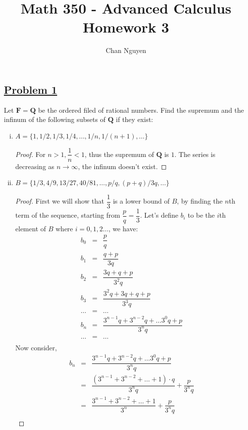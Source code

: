 \documentclass[10pt,letterpaper]{article}
\title{\textbf{Math 350 - Advanced Calculus \\ Homework 3}}
\author{Chan Nguyen}
\begin{document}
\tableofcontents 
\maketitle

\setlength{\parindent}{0pt}
\setlength{\parskip}{1ex}
	\subsection*{{\color{purple}\underline{Problem 1}}}
	Let $\mathbf{F} = \mathbf{Q}$ be the ordered filed of rational numbers. Find the supremum and the infinum of the 
	following subsets of $\mathbf{Q}$ if they exist:
	\begin{enumerate}[(i)]
		\item $A = \{1, 1/2, 1/3, 1/4, \ldots , 1/n, 1/(n + 1), \ldots\}$
		\begin{proof}
		For $n > 1, \dfrac{1}{n} < 1$, thus the supremum of $\mathbf{Q}$ is $1$. The series is decreasing
		as $n \rightarrow \infty$, the infinum doesn't exist.
		\end{proof}
		\item $B = \{1/3, 4/9, 13/27, 40/81, \ldots , p/q, (p + q)/3q, \ldots\}$
		\begin{proof}
		First we will show that $\dfrac{1}{3}$ is a lower bound of $B$, by finding the $n$th term of the sequence, starting 
		from $\dfrac{p}{q} = \dfrac{1}{3}$. Let's define $b_i$ to be the $i$th element of $B$ where $i = 0, 1, 2 \ldots$, we have:
		\begin{eqnarray*}
			b_0 &=& \dfrac{p}{q} \\
			b_1 &=& \dfrac{q + p}{3q} \\
			b_2 &=& \dfrac{3q + q +p}{3^2q} \\
			b_3 &=& \dfrac{3^2q + 3q + q + p}{3^3q} \\
			\ldots &=& \ldots \\
			b_n &=& \dfrac{3^{n-1}q + 3^{n-2}q + \ldots 3^0q + p}{3^nq}\\
			\ldots &=& \ldots \\
		\end{eqnarray*}				
		Now consider,
		\begin{eqnarray*}
			b_n &=& \dfrac{3^{n-1}q + 3^{n-2}q + \ldots 3^0q + p}{3^nq}\\
				&=& \dfrac{(3^{n-1} + 3^{n-2} + \ldots + 1) \cdot q}{3^nq} + \dfrac{p}{3^nq}\\
				&=& \dfrac{3^{n-1} + 3^{n-2} + \ldots + 1}{3^n} + \dfrac{p}{3^nq}\\

\end{eqnarray*}
\end{proof}
\end{enumerate}
\end{document}
